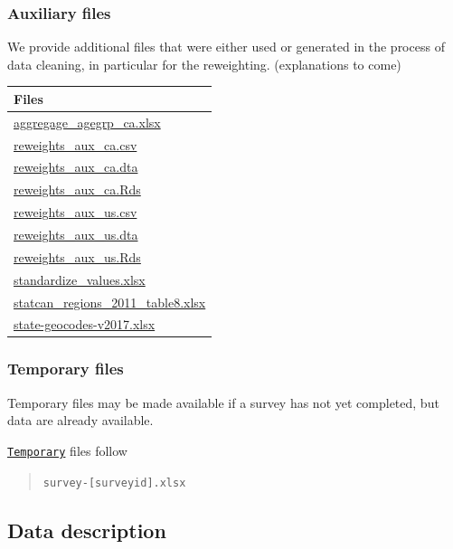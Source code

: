\documentclass[
]{article}
\begin{document}
\hypertarget{auxiliary-files}{%
\subsubsection{Auxiliary files}\label{auxiliary-files}}

We provide additional files that were either used or generated in the
process of data cleaning, in particular for the reweighting.
(explanations to come)

\begin{longtable}[]{@{}l@{}}
\toprule
Files \\
\midrule
\endhead
\href{auxiliary/aggregage_agegrp_ca.xlsx}{aggregage\_agegrp\_ca.xlsx} \\
\href{auxiliary/reweights_aux_ca.csv}{reweights\_aux\_ca.csv} \\
\href{auxiliary/reweights_aux_ca.dta}{reweights\_aux\_ca.dta} \\
\href{auxiliary/reweights_aux_ca.Rds}{reweights\_aux\_ca.Rds} \\
\href{auxiliary/reweights_aux_us.csv}{reweights\_aux\_us.csv} \\
\href{auxiliary/reweights_aux_us.dta}{reweights\_aux\_us.dta} \\
\href{auxiliary/reweights_aux_us.Rds}{reweights\_aux\_us.Rds} \\
\href{auxiliary/standardize_values.xlsx}{standardize\_values.xlsx} \\
\href{auxiliary/statcan_regions_2011_table8.xlsx}{statcan\_regions\_2011\_table8.xlsx} \\
\href{auxiliary/state-geocodes-v2017.xlsx}{state-geocodes-v2017.xlsx} \\
\bottomrule
\end{longtable}

\hypertarget{temporary-files}{%
\subsubsection{Temporary files}\label{temporary-files}}

Temporary files may be made available if a survey has not yet completed,
but data are already available.

\href{temporary/}{\texttt{Temporary}} files follow

\begin{quote}
\texttt{survey-{[}surveyid{]}.xlsx}
\end{quote}

\hypertarget{data-description}{%
\subsection{Data description}\label{data-description}}
\end{document}
